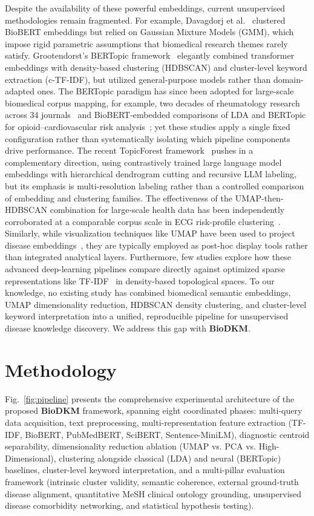 \documentclass[a4paper,fleqn]{cas-dc}
\begin{document}
Despite the availability of these powerful embeddings, current unsupervised methodologies remain fragmented. For example, Davagdorj et al.~\cite{ref15} clustered BioBERT embeddings but relied on Gaussian Mixture Models (GMM), which impose rigid parametric assumptions that biomedical research themes rarely satisfy. Grootendorst's BERTopic framework~\cite{ref17} elegantly combined transformer embeddings with density-based clustering (HDBSCAN) and cluster-level keyword extraction (c-TF-IDF), but utilized general-purpose models rather than domain-adapted ones. The BERTopic paradigm has since been adopted for large-scale biomedical corpus mapping, for example, two decades of rheumatology research across 34 journals~\cite{ref30} and BioBERT-embedded comparisons of LDA and BERTopic for opioid--cardiovascular risk analysis~\cite{ref31}; yet these studies apply a single fixed configuration rather than systematically isolating which pipeline components drive performance. The recent TopicForest framework~\cite{ref29} pushes in a complementary direction, using contrastively trained large language model embeddings with hierarchical dendrogram cutting and recursive LLM labeling, but its emphasis is multi-resolution labeling rather than a controlled comparison of embedding and clustering families. The effectiveness of the UMAP-then-HDBSCAN combination for large-scale health data has been independently corroborated at a comparable corpus scale in ECG risk-profile clustering~\cite{ref32}. Similarly, while visualization techniques like UMAP have been used to project disease embeddings~\cite{ref11,ref19,ref20}, they are typically employed as post-hoc display tools rather than integrated analytical layers. Furthermore, few studies explore how these advanced deep-learning pipelines compare directly against optimized sparse representations like TF-IDF~\cite{ref18} in density-based topological spaces. To our knowledge, no existing study has combined biomedical semantic embeddings, UMAP dimensionality reduction, HDBSCAN density clustering, and cluster-level keyword interpretation into a unified, reproducible pipeline for unsupervised disease knowledge discovery. We address this gap with \textbf{BioDKM}.

\section{Methodology}

Fig.~\ref{fig:pipeline} presents the comprehensive experimental architecture of the proposed \textbf{BioDKM} framework, spanning eight coordinated phases: multi-query data acquisition, text preprocessing, multi-representation feature extraction (TF-IDF, BioBERT, PubMedBERT, SciBERT, Sentence-MiniLM), diagnostic centroid separability, dimensionality reduction ablation (UMAP vs. PCA vs. High-Dimensional), clustering alongside classical (LDA) and neural (BERTopic) baselines, cluster-level keyword interpretation, and a multi-pillar evaluation framework (intrinsic cluster validity, semantic coherence, external ground-truth disease alignment, quantitative MeSH clinical ontology grounding, unsupervised disease comorbidity networking, and statistical hypothesis testing).
\end{document}
